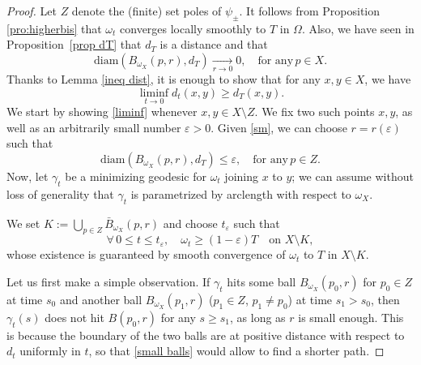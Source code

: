 \documentclass[a4paper,11pt,leqno,english]{smfart}
\theoremstyle{plain}
\theoremstyle{plain}
\numberwithin{equation}{section} %
\numberwithin{figure}{section} %
\theoremstyle{plain}
\theoremstyle{plain}
\theoremstyle{remark}
\theoremstyle{remark}
\theoremstyle{definition}
\theoremstyle{plain}
\theoremstyle{plain}
\theoremstyle{definition}
\newcommand{\p}{\psi}
\newcommand{\ep}{\varepsilon}
\renewcommand{\ge}{\geq}
\renewcommand{\le}{\leq}
\begin{document}
\begin{proof}
Let $Z$ denote the (finite) set poles of $\p_{\pm}$.
It follows from Proposition \ref{pro:higherbis} that
$\omega_t$ converges locally smoothly to $T$ in $\Omega$. 
Also, we have seen in Proposition~\ref{prop dT} that $d_{T}$ is a distance and that 
\begin{equation}
\label{sm}
\mathrm{diam} (B_{\omega_X}(p,r), d_{T}) \underset{r\to 0} \longrightarrow 0,
 \quad \mathrm{for \,\, any} \, p\in X.
\end{equation}
Thanks to Lemma \ref{ineq dist}, it is enough to show that for any $x,y\in X$, we have 
\begin{equation}
\label{liminf}
\liminf_{t \rightarrow 0} d_t(x,y) \ge  d_{T}(x,y).
\end{equation}
We start by showing \eqref{liminf} whenever $x,y\in X\setminus Z$. We fix two such points $x,y$, as well as an arbitrarily small number $\ep>0$. Given \eqref{sm}, we can choose $r=r(\ep)$ such that 
\begin{equation}
\label{small balls}
\mathrm{diam} (B_{\omega_X}(p,r), d_{T}) \le \ep, \quad \mathrm{for \,\, any} \, p\in Z.
\end{equation}
Now, let $\gamma_t$ be a minimizing geodesic for $\omega_t$ joining $x$ to $y$; we can assume without loss of generality that $\gamma_t$ is parametrized by arclength with respect to $\omega_X$. 

We set $K:=\bigcup_{p\in Z} \bar B_{\omega_X}(p,r)$ and choose $t_{\ep}$ such that 
\begin{equation}
\label{minoration}
\forall \,0\le t \le t_{\ep}, \quad \omega_t \ge (1-\ep) T \quad \mathrm{on} \,\, X\setminus K,
\end{equation}
whose existence is guaranteed by smooth convergence of $\omega_t$ to $T$ in $X\setminus K$.


Let us first make a simple observation. If $\gamma_t$ hits some ball $B_{\omega_X}(p_0,r)$ for $p_0\in Z$ at time $s_0$ and another ball $B_{\omega_X}(p_1,r)$ ($p_1\in Z$, $p_1\neq p_0$) at time $s_1>s_0$, then $\gamma_t(s)$ does not hit $B(p_0,r)$ for any $s\ge s_1$, as long as $r$ is small enough. This is because the boundary of the two balls are at positive distance with respect to $d_t$ uniformly in $t$, so that \eqref{small balls} would allow to find a shorter path. 


\end{proof}
\end{document}

